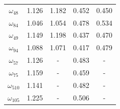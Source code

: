 \documentclass[preprint,12pt]{elsarticle}
\begin{document}
\begin{table}[]
\begin{tabular}{|c|c|c|c|c|}
       \hline
       $\omega_{48}$ &1.126 &1.182 &0.452 &0.450 \\ 
       $\omega_{84}$  &1.046 &1.054 &0.478 &0.534 \\
       \hline
       $\omega_{49}$ &1.149 &1.198 &0.437 &0.470 \\ 
       $\omega_{94}$  &1.088 &1.071 &0.417 &0.479 \\
       \hline
       $\omega_{57}$ &1.126 &- &0.483 &- \\ 
       $\omega_{75}$  &1.159 &- &0.459 &- \\
       \hline
       $\omega_{510}$ &1.141 &- &0.482 &- \\ 
       $\omega_{105}$  &1.225 &- &0.506 &- \\
       \hline
    \end{tabular}
    \label{tab:migration_barriers_cr_v}
\end{table}

\FloatBarrier

 

\end{document}
